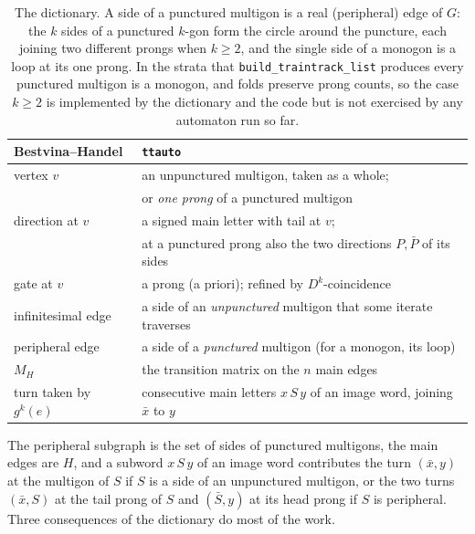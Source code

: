 \documentclass[12pt]{amsart}
\newcommand{\anti}[1]{\bar{#1}}          %
\newcommand{\Dg}{D}                       %
\newcommand{\per}{P}                      %
\newcommand{\ttauto}{\texttt{ttauto}}
\theoremstyle{plain}
\theoremstyle{definition}
\begin{document}
\begin{table}[h]
  \centering
  \begin{tabular}{@{}ll@{}}
    \toprule
    Bestvina--Handel & \ttauto \\
    \midrule
    vertex $v$ & an unpunctured multigon, taken as a whole; \\
               & or \emph{one prong} of a punctured multigon \\
    direction at $v$ & a signed main letter with tail at $v$; \\
                     & at a punctured prong also the two directions
                       $\per,\anti\per$ of its sides \\
    gate at $v$ & a prong (a priori); refined by $\Dg^k$-coincidence \\
    infinitesimal edge & a side of an \emph{unpunctured} multigon that
                         some iterate traverses \\
    peripheral edge & a side of a \emph{punctured} multigon (for a
                      monogon, its loop) \\
    $M_H$ & the transition matrix on the $n$ main edges \\
    turn taken by $g^k(e)$ & consecutive main letters $x\,S\,y$ of an image
                             word, joining $\anti x$ to $y$ \\
    \bottomrule
  \end{tabular}
  \caption{The dictionary.  A side of a punctured multigon is a real
    (peripheral) edge of $G$: the $k$ sides of a punctured $k$-gon form
    the circle around the puncture, each joining two different prongs
    when $k\ge2$, and the single side of a monogon is a loop at its one
    prong.  In the strata that \texttt{build\_traintrack\_list} produces every
    punctured multigon is a monogon, and folds preserve prong counts, so
    the case $k\ge2$ is implemented by the dictionary and the code but is
    not exercised by any automaton run so far.}
  \label{tab:dictionary}
\end{table}


The peripheral subgraph is the set of sides of punctured multigons, the
main edges are $H$, and a subword $x\,S\,y$ of an image word contributes
the turn $(\anti x,y)$ at the multigon of $S$ if $S$ is a side of an
unpunctured multigon, or the two turns $(\anti x,S)$ at the tail prong
of $S$ and $(\anti S,y)$ at its head prong if $S$ is peripheral.  Three
consequences of the dictionary do most of the work.
\end{document}
